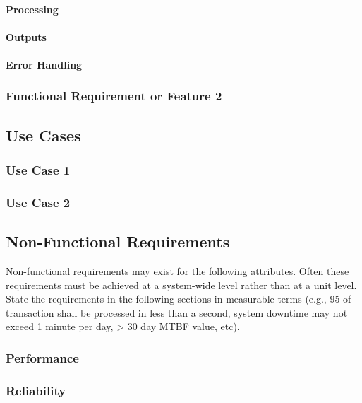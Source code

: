 \documentclass[titlepage]{article}
\begin{document}
\paragraph{Processing}

\paragraph{Outputs}

\paragraph{Error Handling}

\subsubsection{Functional Requirement or Feature 2}

\subsection{Use Cases}

\subsubsection{Use Case 1}

\subsubsection{Use Case 2}

\subsection{Non-Functional Requirements}
Non-functional requirements may exist for the following attributes.  Often these requirements must be achieved at a system-wide level rather than at a unit level.  State the requirements in the following sections in measurable terms (e.g., 95 of transaction shall be processed in less than a second, system downtime may not exceed 1 minute per day, > 30 day MTBF value, etc). 

\subsubsection{Performance}

\subsubsection{Reliability}
\end{document}
